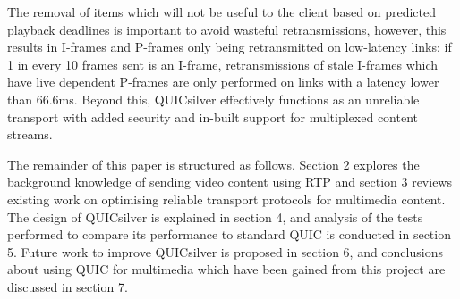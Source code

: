 \documentclass{mpaper}
\begin{document}
The removal of items which will not be useful to the client based on predicted playback deadlines is important to avoid wasteful retransmissions, however, this results in I-frames and P-frames only being retransmitted on low-latency links: if 1 in every 10 frames sent is an I-frame, retransmissions of stale I-frames which have live dependent P-frames are only performed on links with a latency lower than 66.6ms. Beyond this, QUICsilver effectively functions as an unreliable transport with added security and in-built support for multiplexed content streams.










The remainder of this paper is structured as follows. Section 2 explores the background knowledge of sending video content using RTP and section 3 reviews existing work on optimising reliable transport protocols for multimedia content. The design of QUICsilver is explained in section 4, and analysis of the tests performed to compare its performance to standard QUIC is conducted in section 5. Future work to improve QUICsilver is proposed in section 6, and conclusions about using QUIC for multimedia which have been gained from this project are discussed in section 7.
\end{document}
